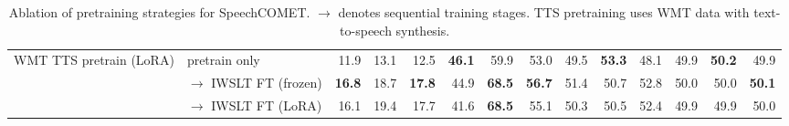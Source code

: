 \begin{table}[t]
\begin{tabular}{p{3cm}l|rrr|rrr|rrr|rrr}
\cmidrule(l){1-14}
\multirow{3}{*}{\parbox[t]{3cm}{\raggedright WMT TTS pretrain (LoRA)}} & pretrain only & \cellcolor[RGB]{219,239,239}11.9 & \cellcolor[RGB]{255,255,255}13.1 & \cellcolor[RGB]{247,251,251}12.5 & \cellcolor[RGB]{196,229,229}\textbf{46.1} & \cellcolor[RGB]{255,255,255}59.9 & \cellcolor[RGB]{226,242,242}53.0 & \cellcolor[RGB]{255,255,255}49.5 & \cellcolor[RGB]{251,196,153}\textbf{53.3} & \cellcolor[RGB]{255,255,255}48.1 & \cellcolor[RGB]{255,255,255}49.9 & \cellcolor[RGB]{232,168,205}\textbf{50.2} & \cellcolor[RGB]{255,255,255}49.9 \\
 & \quad $\to$ IWSLT FT (frozen) & \cellcolor[RGB]{186,225,225}\textbf{16.8} & \cellcolor[RGB]{213,237,237}18.7 & \cellcolor[RGB]{203,232,232}\textbf{17.8} & \cellcolor[RGB]{199,231,230}44.9 & \cellcolor[RGB]{225,242,241}\textbf{68.5} & \cellcolor[RGB]{206,234,233}\textbf{56.7} & \cellcolor[RGB]{253,239,228}51.4 & \cellcolor[RGB]{254,242,233}50.7 & \cellcolor[RGB]{252,211,180}52.8 & \cellcolor[RGB]{255,255,255}50.0 & \cellcolor[RGB]{255,255,255}50.0 & \cellcolor[RGB]{247,226,238}\textbf{50.1} \\
 & \quad $\to$ IWSLT FT (LoRA) & \cellcolor[RGB]{191,227,227}16.1 & \cellcolor[RGB]{209,235,234}19.4 & \cellcolor[RGB]{203,232,232}17.7 & \cellcolor[RGB]{208,234,234}41.6 & \cellcolor[RGB]{225,242,241}\textbf{68.5} & \cellcolor[RGB]{215,237,237}55.1 & \cellcolor[RGB]{254,251,249}50.3 & \cellcolor[RGB]{254,246,239}50.5 & \cellcolor[RGB]{252,217,190}52.4 & \cellcolor[RGB]{255,255,255}49.9 & \cellcolor[RGB]{255,255,255}49.9 & \cellcolor[RGB]{255,255,255}50.0 \\
\bottomrule
\end{tabular}
\caption{Ablation of pretraining strategies for SpeechCOMET. $\to$ denotes sequential training stages. TTS pretraining uses WMT data with text-to-speech synthesis.}\label{tab:tts_ablation}
\end{table}

